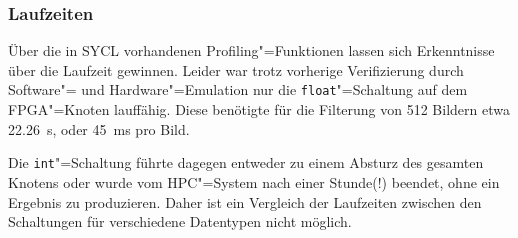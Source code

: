 \subsubsection{Laufzeiten}

Über die in SYCL vorhandenen Profiling"=Funktionen lassen sich Erkenntnisse über
die Laufzeit gewinnen. Leider war trotz vorherige Verifizierung durch Software"=
und Hardware"=Emulation nur die \texttt{float}"=Schaltung auf dem FPGA"=Knoten
lauffähig. Diese benötigte für die Filterung von 512 Bildern etwa
\SI{22.26}{\second}, oder \SI{45}{\milli\second} pro Bild.

Die \texttt{int}"=Schaltung führte dagegen entweder zu einem Absturz des
gesamten Knotens oder wurde vom HPC"=System nach einer Stunde(!) beendet, ohne
ein Ergebnis zu produzieren. Daher ist ein Vergleich der Laufzeiten zwischen
den Schaltungen für verschiedene Datentypen nicht möglich.
